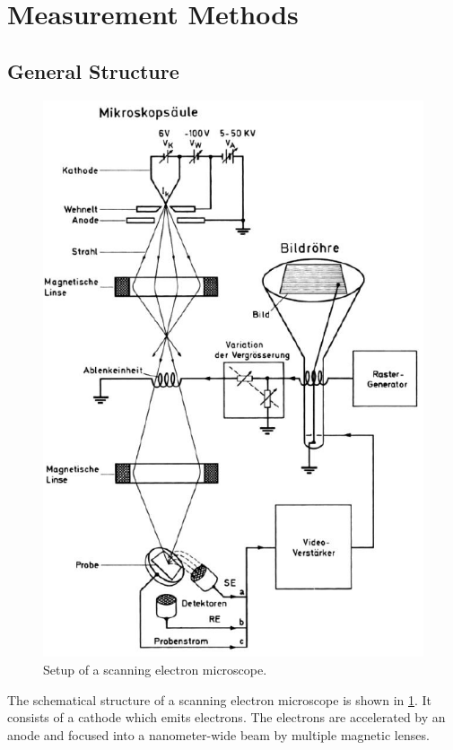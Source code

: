 \section{Measurement Methods}

\subsection{General Structure}
\begin{figure}
	\centering
	\includegraphics[width=0.95\linewidth]{../assets/aufbau.png}
	\caption{Setup of a scanning electron microscope. }
	\label{fig:general_structure}
\end{figure}
The schematical structure of a scanning electron microscope is shown in
\cref{fig:general_structure}. It consists of a cathode which emits
electrons. 
The electrons are accelerated by an anode and focused into a 
nanometer-wide beam by multiple magnetic lenses.

